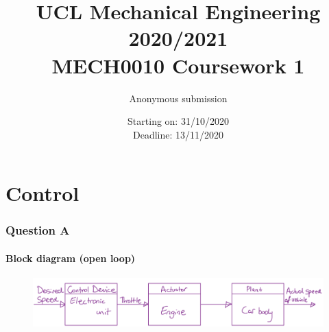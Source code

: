\documentclass[12pt]{article}
\numberwithin{equation}{section}
\begin{document}
\title{\textbf{UCL Mechanical Engineering 2020/2021}\\MECH0010 Coursework 1}
\date{Starting on: 31/10/2020\\Deadline: 13/11/2020}
\author{Anonymous submission}
\maketitle
\tableofcontents
\newpage
\part{Control}
\section{Question A}
\subsection*{Block diagram (open loop)}
\begin{figure}[H]
  \centering
  \includegraphics[width=\textwidth]{./img/1-1blockdiagram.png}
\end{figure}
\end{document}
